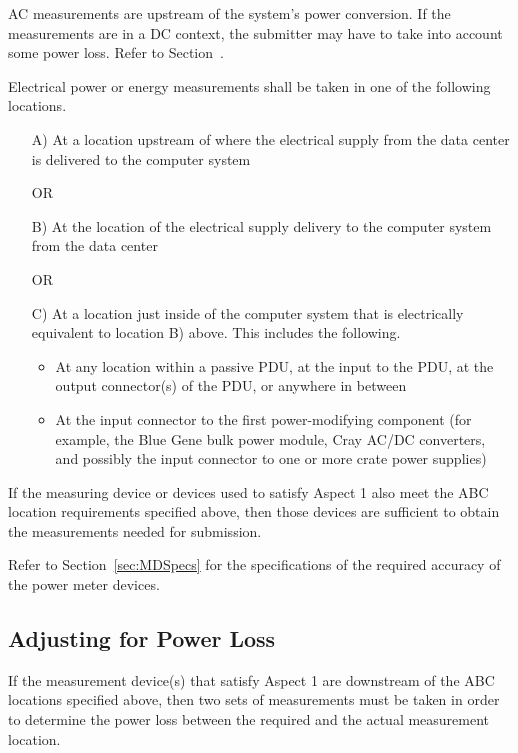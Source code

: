 \noindent
AC measurements are upstream of the system's power conversion.
If the measurements are in a DC context, the submitter may have to take into account some power loss.
Refer to Section~.
\wl

\noindent
Electrical power or energy measurements shall be taken in one of the following locations.

\begin{itemize}
\item[{A)}]
At a location upstream of where the electrical supply from the data center is delivered to the computer system

OR

\item[{B)}]
At the location of the electrical supply delivery to the computer system from the data center

OR

\item[{C)}]
At a location just inside of the computer system that is electrically equivalent to location B) above.
This includes the following.

\begin{itemize}
\item
At any location within a passive PDU, at the input to the PDU, at the output connector(s) of the PDU, or anywhere in between 
\item
At the input connector to the first power-modifying component (for example, the Blue Gene bulk power module, Cray AC/DC converters, and possibly the input connector to one or more crate power supplies)
\end{itemize}
\end{itemize}

\noindent
If the measuring device or devices used to satisfy Aspect 1 also meet the ABC location requirements specified above, then those devices are sufficient to obtain the measurements needed for submission.
\wl

\noindent
Refer to Section~\ref{sec:MDSpecs} for the specifications of the required accuracy of the power meter devices.

\subsection{Adjusting for Power Loss}
\label{sec:AfPL}
\noindent
If the measurement device(s) that satisfy Aspect 1 are downstream of the ABC locations specified above, then two sets of measurements must be taken in order to determine the power loss between the required and the actual measurement location.

